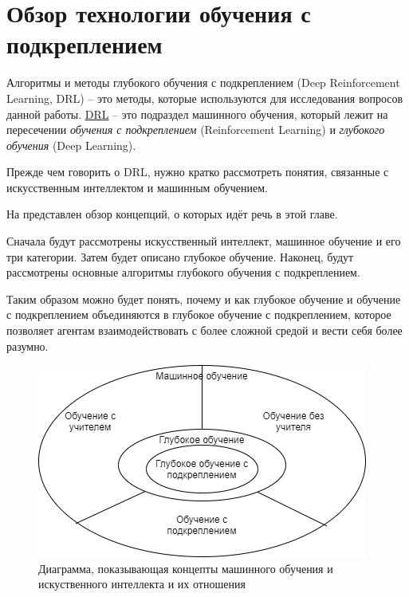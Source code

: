 \chapter{Обзор технологии обучения с подкреплением} \label{ch1}


Алгоритмы и методы глубокого обучения с подкреплением (Deep Reinforcement Learning, DRL) – это методы, которые используются для исследования вопросов данной работы. \hyperref[acr:drl]{DRL} – это подраздел машинного обучения, который лежит на пересечении \textit{обучения с подкреплением} (Reinforcement Learning) и \textit{глубокого обучения} (Deep Learning).

Прежде чем говорить о DRL, нужно кратко рассмотреть понятия, связанные с искусственным интеллектом и машинным обучением.

На  представлен обзор концепций, о которых идёт речь в этой главе. 

Сначала будут рассмотрены искусственный интеллект, машинное обучение и его три категории. Затем будет описано глубокое обучение. Наконец, будут рассмотрены основные алгоритмы глубокого обучения с подкреплением.

Таким образом можно будет понять, почему и как глубокое обучение и обучение с подкреплением объединяются в глубокое обучение с подкреплением, которое позволяет агентам взаимодействовать с более сложной средой и вести себя более разумно.

\begin{figure}[ht!] 
	\center
	\includegraphics [scale=0.80] {my_folder/images/ch1/ML-and-AI-concepts.png}
	\caption{Диаграмма, показывающая концепты машинного обучения и искуственного интеллекта и их отношения} 
	\label{fig:ch1-ML-and-AI-concepts}  
\end{figure}


